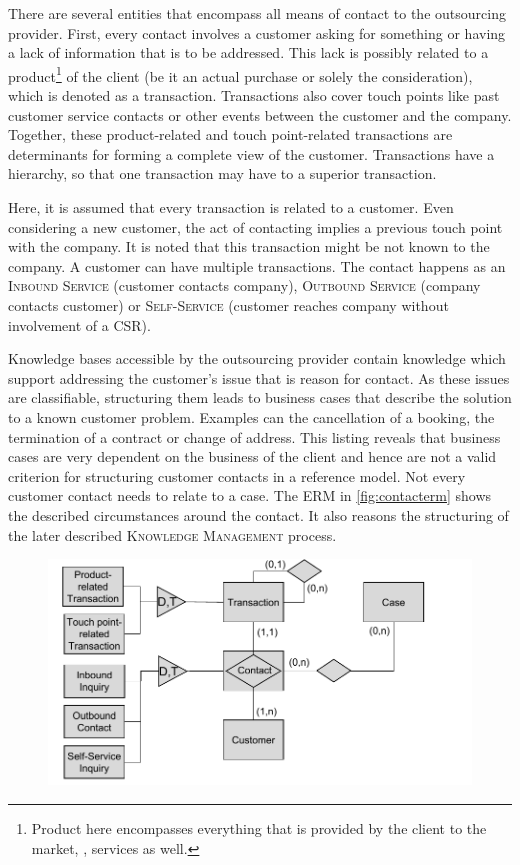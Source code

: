 	 There are several entities that encompass all means of contact to the outsourcing provider. First, every contact involves a customer asking for something or having a lack of information that is to be addressed. This lack is possibly related to a product\footnote{Product here encompasses everything that is provided by the client to the market, \ie, services as well.} of the client (be it an actual purchase or solely the consideration), which is denoted as a transaction. Transactions also cover touch points like past customer service contacts or other events between the customer and the company. Together, these product-related and touch point-related transactions are determinants for forming a complete view of the customer. Transactions have a hierarchy, so that one transaction may have to a superior transaction. 
	 
	 Here, it is assumed that every transaction is related to a customer. Even considering a new customer, the act of contacting implies a previous touch point with the company. It is noted that this transaction might be not known to the company. A customer can have multiple transactions. The contact happens as an \textsc{Inbound Service } (customer contacts company), \textsc{Outbound Service} (company contacts customer) or\textsc{ Self-Service} (customer reaches company without involvement of a \acrshort{CSR}). 
	 
	 Knowledge bases accessible by the outsourcing provider contain knowledge which support addressing the customer's issue that is reason for contact. As these issues are classifiable, structuring them leads to business cases that describe the solution to a known customer problem. Examples can the cancellation of a booking, the termination of a contract or change of address. This listing reveals that business cases are very dependent on the business of the client and hence are not a valid criterion for structuring customer contacts in a reference model. Not every customer contact needs to relate to a case. The \acrshort{ERM} in \Fig \ref{fig:contacterm} shows the described circumstances around the contact. It also reasons the structuring of the later described \textsc{Knowledge Management} process. 
	 
	 \begin{figure}[caption={\acrshort{ERM} of Customer-facing Services}, label={fig:contacterm}]
	 	{	\includegraphics[width=.8\textwidth]{figures/contacterm.pdf}}
	 \end{figure} 
	 
